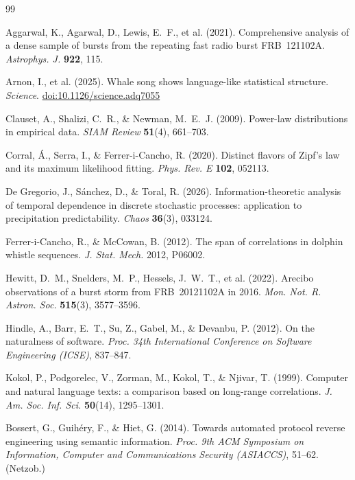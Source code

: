 \documentclass[11pt,a4paper]{article}
\providecommand{\doi}[1]{\href{https://doi.org/#1}{doi:#1}}
\begin{document}
\begin{thebibliography}{99}
\small

 Aggarwal, K., Agarwal, D., Lewis, E.~F., et al. (2021).
Comprehensive analysis of a dense sample of bursts from the repeating fast radio burst
FRB~121102A. \emph{Astrophys. J.} \textbf{922}, 115.

 Arnon, I., et al. (2025). Whale song shows language-like statistical
structure. \emph{Science}. \doi{10.1126/science.adq7055}

 Clauset, A., Shalizi, C.~R., \& Newman, M.~E.~J. (2009).
Power-law distributions in empirical data. \emph{SIAM Review} \textbf{51}(4), 661--703.

 Corral, \'A., Serra, I., \& Ferrer-i-Cancho, R. (2020). Distinct
flavors of Zipf's law and its maximum likelihood fitting. \emph{Phys. Rev. E}
\textbf{102}, 052113.

 De Gregorio, J., S\'anchez, D., \& Toral, R. (2026).
Information-theoretic analysis of temporal dependence in discrete stochastic
processes: application to precipitation predictability. \emph{Chaos} \textbf{36}(3),
033124.

 Ferrer-i-Cancho, R., \& McCowan, B. (2012). The span of
correlations in dolphin whistle sequences. \emph{J. Stat. Mech.} 2012, P06002.

 Hewitt, D.~M., Snelders, M.~P., Hessels, J.~W.~T., et al. (2022).
Arecibo observations of a burst storm from FRB~20121102A in 2016. \emph{Mon. Not. R.
Astron. Soc.} \textbf{515}(3), 3577--3596.

 Hindle, A., Barr, E.~T., Su, Z., Gabel, M., \& Devanbu, P.
(2012). On the naturalness of software. \emph{Proc. 34th International Conference on
Software Engineering (ICSE)}, 837--847.

 Kokol, P., Podgorelec, V., Zorman, M., Kokol, T., \& Njivar, T.
(1999). Computer and natural language texts: a comparison based on long-range
correlations. \emph{J. Am. Soc. Inf. Sci.} \textbf{50}(14), 1295--1301.

 Bossert, G., Guih\'ery, F., \& Hiet, G. (2014). Towards automated
protocol reverse engineering using semantic information. \emph{Proc. 9th ACM Symposium
on Information, Computer and Communications Security (ASIACCS)}, 51--62. (Netzob.)


\end{thebibliography}
\end{document}

